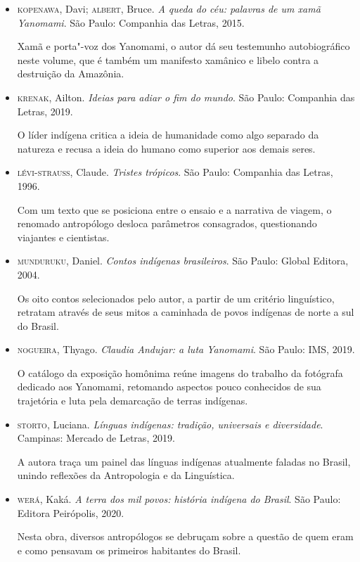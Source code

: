 \documentclass[12pt]{extarticle}
\begin{document}
\begin{itemize}
\item \textsc{kopenawa}, Davi; \textsc{albert}, Bruce. \textit{A queda do céu: palavras de um
xamã Yanomami}. São Paulo: Companhia das Letras, 2015.

Xamã e porta"-voz dos Yanomami, o autor dá seu testemunho autobiográfico
neste volume, que é também um manifesto xamânico e libelo contra a
destruição da Amazônia.

\item \textsc{krenak}, Ailton. \textit{Ideias para adiar o fim do mundo}. São Paulo:
Companhia das Letras, 2019.

O líder indígena critica a ideia de humanidade como algo separado da
natureza e recusa a ideia do humano como superior aos demais seres.

\item \textsc{lévi-strauss}, Claude. \textit{Tristes trópicos}. São Paulo: Companhia das
Letras, 1996.

Com um texto que se posiciona entre o ensaio e a narrativa de viagem, o
renomado antropólogo desloca parâmetros consagrados, questionando
viajantes e cientistas.

\item \textsc{munduruku}, Daniel. \textit{Contos indígenas brasileiros}. São Paulo:
Global Editora, 2004.

Os oito contos selecionados pelo autor, a partir de um critério
linguístico, retratam através de seus mitos a caminhada de povos
indígenas de norte a sul do Brasil.

\item \textsc{nogueira}, Thyago. \textit{Claudia Andujar: a luta Yanomami}. São Paulo:
IMS, 2019.

O catálogo da exposição homônima reúne imagens do trabalho da fotógrafa
dedicado aos Yanomami, retomando aspectos pouco conhecidos de sua
trajetória e luta pela demarcação de terras indígenas.

\item \textsc{storto}, Luciana. \textit{Línguas indígenas: tradição, universais e
diversidade}. Campinas: Mercado de Letras, 2019.

A autora traça um painel das línguas indígenas atualmente faladas no
Brasil, unindo reflexões da Antropologia e da Linguística.

\item \textsc{werá}, Kaká. \textit{A terra dos mil povos: história indígena do Brasil}.
São Paulo: Editora Peirópolis, 2020.

Nesta obra, diversos antropólogos se debruçam sobre a questão de quem
eram e como pensavam os primeiros habitantes do Brasil.
\end{itemize}
\end{document}
